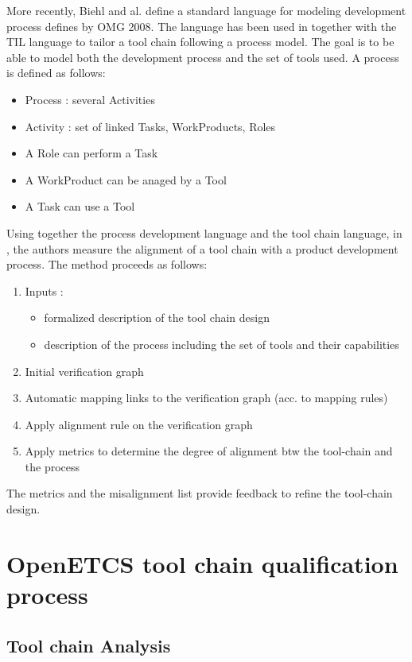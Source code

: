 \documentclass{openetcs_report}
\begin{document}
More recently, Biehl and al.  define a standard language for modeling
development process defines by OMG 2008. The language has been used in
\cite{biehl_constructing_2012,biehl_early_2012} together with the TIL
language to tailor a tool chain following a process model. The goal is
to be able to model both the development process and the set of tools
used.  A process is defined as follows:
\begin{itemize}
\item Process : several Activities
\item Activity : set of linked Tasks, WorkProducts, Roles
\item A Role can perform a Task
\item A WorkProduct can be anaged by a Tool
\item A Task can use a Tool
\end{itemize}
Using together the process development language  and the tool chain
language, in \cite{biehl_early_2012}, the authors  measure the alignment of a tool chain
with a product development process. The method proceeds as follows:
\begin{enumerate}
\item Inputs :
  \begin{itemize}
  \item formalized description of the tool chain design
  \item description of the process including the set of tools and their capabilities
  \end{itemize}
\item Initial verification graph
\item Automatic mapping links to the verification graph (acc. to mapping rules)
\item Apply alignment rule on the verification graph
\item Apply metrics to determine the degree of alignment btw the tool-chain and the
   process
\end{enumerate}
The metrics and the misalignment list provide feedback to refine the tool-chain
design.



\chapter{OpenETCS tool chain qualification process}
\label{chap-2}

\section{Tool chain Analysis}
\label{sec-2-1}
\end{document}
